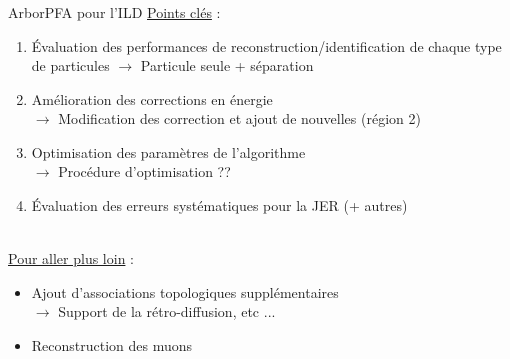 \documentclass[8pt]{beamer}
\begin{document}
  \begin{frame}
  \frametitle{\secname}
  \framesubtitle{\subsecname}
    \begin{block}{ArborPFA pour l'ILD}
      \underline{Points clés} :
      \begin{enumerate}
        \item Évaluation des performances de reconstruction/identification de chaque type de particules
        $\rightarrow$ Particule seule + séparation
        \item Amélioration des corrections en énergie \\
        $\rightarrow$ Modification des correction et ajout de nouvelles (région 2)
        \item Optimisation des paramètres de l'algorithme \\
        $\rightarrow$ Procédure d'optimisation ??
        \item Évaluation des erreurs systématiques pour la JER (+ autres)
      \end{enumerate}
      ~ \\
      \underline{Pour aller plus loin} :
      \begin{itemize}
        \item Ajout d'associations topologiques supplémentaires \\
        $\rightarrow$ Support de la rétro-diffusion, etc ...
        \item Reconstruction des muons
      \end{itemize}
    \end{block}
  \end{frame}
\end{document}
